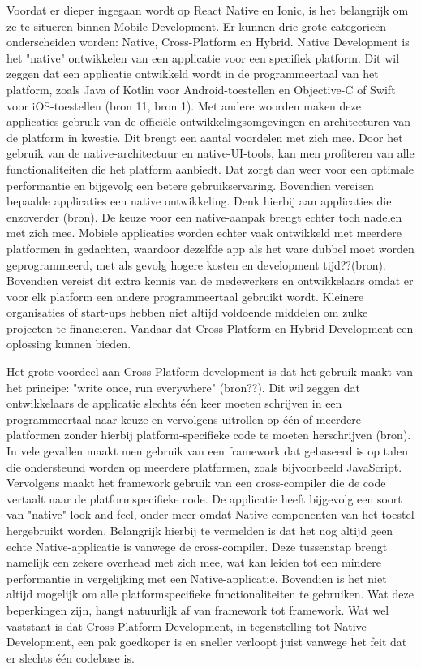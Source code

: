 Voordat er dieper ingegaan wordt op React Native en Ionic, is het belangrijk om ze te situeren binnen Mobile Development. Er kunnen drie grote categorieën onderscheiden worden: Native, Cross-Platform en Hybrid. Native Development is het "native" ontwikkelen van een applicatie voor een specifiek platform. Dit wil zeggen dat een applicatie ontwikkeld wordt in de programmeertaal van het platform, zoals Java of Kotlin voor Android-toestellen en Objective-C of Swift voor iOS-toestellen (bron 11, bron 1). Met andere woorden maken deze applicaties gebruik van de officiële ontwikkelingsomgevingen en architecturen van de platform in kwestie. Dit brengt een aantal voordelen met zich mee. Door het gebruik van de native-architectuur en native-UI-tools, kan men profiteren van alle functionaliteiten die het platform aanbiedt. Dat zorgt dan weer voor een optimale performantie en bijgevolg een betere gebruikservaring. Bovendien vereisen bepaalde applicaties een native ontwikkeling. Denk hierbij aan applicaties die 
 enzoverder (bron). De keuze voor een native-aanpak brengt echter toch nadelen met zich mee. Mobiele applicaties worden echter vaak ontwikkeld met meerdere platformen in gedachten, waardoor dezelfde app als het ware dubbel moet worden geprogrammeerd, met als gevolg hogere kosten en development tijd??(bron). Bovendien vereist dit extra kennis van de medewerkers en ontwikkelaars omdat er voor elk platform een andere programmeertaal gebruikt wordt. Kleinere organisaties of start-ups hebben niet altijd voldoende middelen om zulke projecten te financieren. Vandaar dat Cross-Platform en Hybrid Development een oplossing kunnen bieden.

Het grote voordeel aan Cross-Platform development is dat het gebruik maakt van het principe: "write once, run everywhere" (bron??). Dit wil zeggen dat ontwikkelaars de applicatie slechts één keer moeten schrijven in een programmeertaal naar keuze en vervolgens uitrollen op één of meerdere platformen zonder hierbij platform-specifieke code te moeten herschrijven (bron). In vele gevallen maakt men gebruik van een framework dat gebaseerd is op talen die ondersteund worden op meerdere platformen, zoals bijvoorbeeld JavaScript. Vervolgens maakt het framework gebruik van een cross-compiler die de code vertaalt naar de platformspecifieke code. De applicatie heeft bijgevolg een soort van "native" look-and-feel, onder meer omdat Native-componenten van het toestel hergebruikt worden. Belangrijk hierbij te vermelden is dat het nog altijd geen echte Native-applicatie is vanwege de cross-compiler. Deze tussenstap brengt namelijk een zekere overhead met zich mee, wat kan leiden tot een mindere performantie in vergelijking met een Native-applicatie. Bovendien is het niet altijd mogelijk om alle platformspecifieke functionaliteiten te gebruiken. Wat deze beperkingen zijn, hangt natuurlijk af van framework tot framework. Wat wel vaststaat is dat Cross-Platform Development, in tegenstelling tot Native Development, een pak goedkoper is en sneller verloopt juist vanwege het feit dat er slechts één codebase is.

